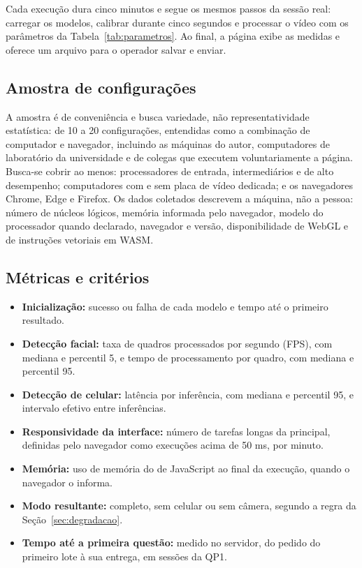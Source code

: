Cada execução dura cinco minutos e segue os mesmos passos da sessão real: carregar os modelos, calibrar durante cinco segundos e processar o vídeo com os parâmetros da Tabela~\ref{tab:parametros}. Ao final, a página exibe as medidas e oferece um arquivo para o operador salvar e enviar.

\subsection{Amostra de configurações}

A amostra é de conveniência e busca variedade, não representatividade estatística: de 10 a 20 configurações, entendidas como a combinação de computador e navegador, incluindo as máquinas do autor, computadores de laboratório da universidade  e  de colegas que executem voluntariamente a página. Busca-se cobrir ao menos: processadores de entrada, intermediários e de alto desempenho; computadores com e sem placa de vídeo dedicada; e os navegadores Chrome, Edge e Firefox. Os dados coletados descrevem a máquina, não a pessoa: número de núcleos lógicos, memória informada pelo navegador, modelo do processador quando declarado, navegador e versão, disponibilidade de WebGL e de instruções vetoriais em WASM.

\subsection{Métricas e critérios}

\begin{itemize}
  \item \textbf{Inicialização:} sucesso ou falha de cada modelo e tempo até o primeiro resultado.
  \item \textbf{Detecção facial:} taxa de quadros processados por segundo (FPS), com mediana e percentil 5, e tempo de processamento por quadro, com mediana e percentil 95.
  \item \textbf{Detecção de celular:} latência por inferência, com mediana e percentil 95, e intervalo efetivo entre inferências.
  \item \textbf{Responsividade da interface:} número de tarefas longas da  principal, definidas pelo navegador como execuções acima de 50 ms, por minuto.
  \item \textbf{Memória:} uso de memória do  de JavaScript ao final da execução, quando o navegador o informa.
  \item \textbf{Modo resultante:} completo, sem celular ou sem câmera, segundo a regra da Seção~\ref{sec:degradacao}.
  \item \textbf{Tempo até a primeira questão:} medido no servidor, do pedido do primeiro lote à sua entrega, em sessões da QP1.
\end{itemize}

